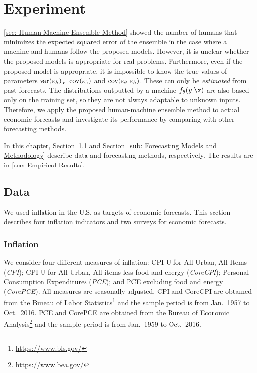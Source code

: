 \documentclass[../main.tex]{subfiles}
\begin{document}
\section{Experiment}
\label{sec: Experiment}

\ref{sec: Human-Machine Ensemble Method} showed the number of humans that minimizes the expected squared error of the ensemble in the case where a machine and humans follow the proposed models.
However, it is unclear whether the proposed models is appropriate for real problems.
Furthermore, even if the proposed model is appropriate, it is impossible to know the true values of parameters $\operatorname{var}(\varepsilon_h)$，$\operatorname{cov}(\varepsilon_h)$ and $\operatorname{cov}(\varepsilon_\theta, \varepsilon_h)$.
These can only be \emph{estimated} from past forecasts.
The distributions outputted by a machine $f_\theta(y|\x)$ are also based only on the training set, so they are not always adaptable to unknown inputs.
Therefore, we apply the proposed human-machine ensemble method to actual economic forecasts and investigate its performance by comparing with other forecasting methods.

In this chapter, Section~\ref{sub: Data} and Section~\ref{sub: Forecasting Models and Methodology} describe data and forecasting methods, respectively.
The results are in \ref{sec: Empirical Results}.

\subsection{Data}
\label{sub: Data}

We used inflation in the U.S. as targets of economic forecasts.
This section describes four inflation indicators and two surveys for economic forecasts.

\subsubsection{Inflation}

We consider four different measures of inflation: CPI-U for All Urban, All Items (\emph{CPI}); CPI-U for All Urban, All items less food and energy (\emph{CoreCPI}); Personal Consumption Expenditures (\emph{PCE}); and PCE excluding food and energy (\emph{CorePCE}).
All measures are seasonally adjusted.
CPI and CoreCPI are obtained from the Bureau of Labor Statistics\footnote{\url{https://www.bls.gov/}} and the sample period is from Jan.\ 1957 to Oct.\ 2016.
PCE and CorePCE are obtained from the Bureau of Economic Analysis\footnote{\url{https://www.bea.gov/}} and the sample period is from Jan.\ 1959 to Oct.\ 2016.
\end{document}
